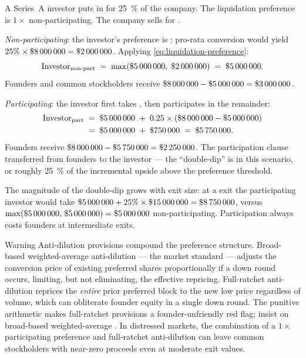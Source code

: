 \begin{example}
A Series~A investor puts in  for \qty{25}{\percent} of the company. The
liquidation preference is \(1\times\) non-participating. The company sells for .

\emph{Non-participating}: the investor's preference is ; pro-rata conversion
would yield \(25\% \times \$\num{8000000} = \$\num{2000000}\). Applying \cref{eq:liquidation-preference}:
\[
  \mathrm{Investor}_{\text{non-part}}
  \;=\; \max(\$\num{5000000},\;\$\num{2000000})
  \;=\; \$\num{5000000}.
\]
Founders and common stockholders receive \(\$\num{8000000} - \$\num{5000000} = \$\num{3000000}\).

\emph{Participating}: the investor first takes , then participates in the
remainder:
\[
  \begin{aligned}
    \mathrm{Investor}_{\text{part}}
    &\;=\; \$\num{5000000} \;+\; 0.25 \times (\$\num{8000000} - \$\num{5000000}) \\
    &\;=\; \$\num{5000000} \;+\; \$\num{750000} \;=\; \$\num{5750000}.
  \end{aligned}
\]
Founders receive \(\$\num{8000000} - \$\num{5750000} = \$\num{2250000}\). The participation
clause transferred  from founders to the investor --- the ``double-dip'' is
 in this scenario, or roughly \qty{25}{\percent} of the incremental upside
above the preference threshold.

The magnitude of the double-dip grows with exit size: at a  exit the
participating investor would take \(\$\num{5000000} + 25\%\times\$\num{15000000} =
\$\num{8750000}\), versus \(\max(\$\num{5000000},\,\$\num{5000000}) = \$\num{5000000}\)
non-participating. Participation always costs founders at intermediate exits.
\end{example}

\begin{admonition}{Warning}
Anti-dilution provisions compound the preference structure. Broad-based weighted-average
anti-dilution --- the market standard --- adjusts the conversion price of existing preferred
shares proportionally if a down round occurs, limiting, but not eliminating, the effective
repricing. Full-ratchet anti-dilution reprices the \emph{entire} prior preferred block to the
new low price regardless of volume, which can obliterate founder equity in a single down
round. The punitive arithmetic makes full-ratchet provisions a founder-unfriendly red flag;
insist on broad-based weighted-average \parencite{feld2019venture}. In distressed markets,
the combination of a \(1\times\) participating preference and full-ratchet anti-dilution can
leave common stockholders with near-zero proceeds even at moderate exit values.
\end{admonition}

